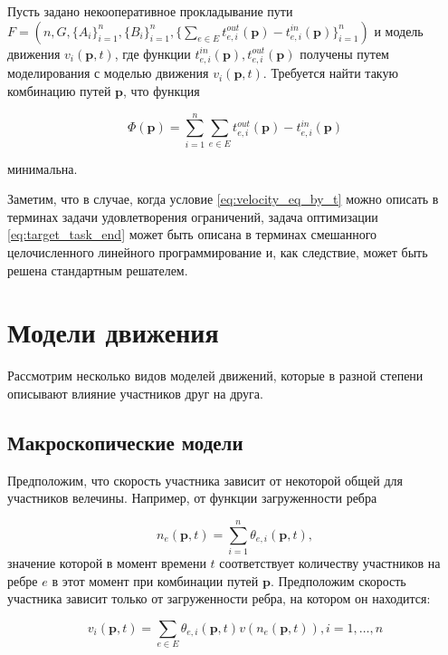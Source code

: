 \documentclass[12pt, a4paper]{article}
\begin{document}
Пусть задано некооперативное прокладывание пути $F = (n, G, \{A_i\}_{i = 1}^{n}, \{B_i\}_{i = 1}^{n}, \{\sum \limits_{e \in E} t_{e, i}^{out}(\textbf{p}) - t_{e, i}^{in}(\textbf{p})\}_{i = 1}^{n})$ и модель движения $v_i(\textbf{p}, t)$, где функции $t_{e, i}^{in}(\textbf{p}), t_{e, i}^{out}(\textbf{p})$ получены путем моделирования с моделью движения $v_i(\textbf{p}, t)$. Требуется найти такую комбинацию путей $\textbf{p}$, что функция 

\begin{equation}
\label{eq:target_task_end}
\Phi(\textbf{p}) =\sum \limits_{i = 1}^n \sum \limits_{e \in E} t_{e, i}^{out}(\textbf{p}) - t_{e, i}^{in}(\textbf{p})
\end{equation}

минимальна.

Заметим, что в случае, когда условие \eqref{eq:velocity_eq_by_t} можно описать в терминах задачи удовлетворения ограничений, задача оптимизации \eqref{eq:target_task_end} может быть описана в терминах смешанного целочисленного линейного программирование и, как следствие, может быть решена стандартным решателем.

\newpage
\section{Модели движения}

Рассмотрим несколько видов моделей движений, которые в разной степени описывают влияние участников друг на друга.

\subsection{Макроскопические модели}

Предположим, что скорость участника зависит от некоторой общей для участников велечины. Например, от функции загруженности ребра

$$ n_{e}(\textbf{p}, t) = \sum\limits_{i = 1}^n\theta_{e, i}(\textbf{p}, t),$$
значение которой в момент времени $t$ соответствует количеству участников на ребре $e$ в этот момент при комбинации путей $\textbf{p}$. Предположим скорость участника зависит только от загруженности ребра, на котором он находится:

\begin{equation}
	\label{eq:velocity_eq_macro}
	 v_i(\textbf{p}, t) = \sum \limits _{e \in E} \theta_{e, i} (\textbf{p}, t) v (n_e (\textbf{p}, t)),  i = 1, \dots, n
\end{equation}
\end{document}
